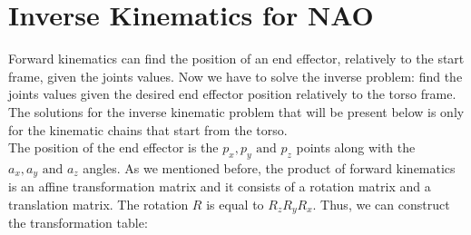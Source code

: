 \section{Inverse Kinematics for NAO}
Forward kinematics can find the position of an end effector, relatively to the start frame, given the joints values. Now we have to solve the inverse problem: find the joints values given the desired end effector position relatively to the torso frame. The solutions for the inverse kinematic problem that will be present below is only for the kinematic chains that start from the torso.\\
The position of the end effector is the \(p_x,p_y\text{ and }p_z\) points along with the \(a_x,a_y\text{ and }a_z\) angles. As we mentioned before, the product of forward kinematics is an affine transformation matrix and it consists of a rotation matrix and a translation matrix. The rotation \(R\) is equal to \(R_zR_yR_x\). Thus, we can construct the transformation table:

